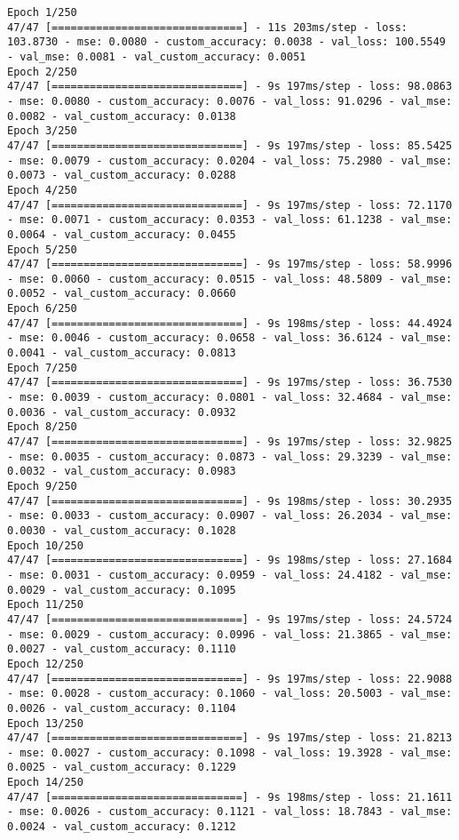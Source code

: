 \begin{lstlisting}
Epoch 1/250
47/47 [==============================] - 11s 203ms/step - loss: 103.8730 - mse: 0.0080 - custom_accuracy: 0.0038 - val_loss: 100.5549 - val_mse: 0.0081 - val_custom_accuracy: 0.0051
Epoch 2/250
47/47 [==============================] - 9s 197ms/step - loss: 98.0863 - mse: 0.0080 - custom_accuracy: 0.0076 - val_loss: 91.0296 - val_mse: 0.0082 - val_custom_accuracy: 0.0138
Epoch 3/250
47/47 [==============================] - 9s 197ms/step - loss: 85.5425 - mse: 0.0079 - custom_accuracy: 0.0204 - val_loss: 75.2980 - val_mse: 0.0073 - val_custom_accuracy: 0.0288
Epoch 4/250
47/47 [==============================] - 9s 197ms/step - loss: 72.1170 - mse: 0.0071 - custom_accuracy: 0.0353 - val_loss: 61.1238 - val_mse: 0.0064 - val_custom_accuracy: 0.0455
Epoch 5/250
47/47 [==============================] - 9s 197ms/step - loss: 58.9996 - mse: 0.0060 - custom_accuracy: 0.0515 - val_loss: 48.5809 - val_mse: 0.0052 - val_custom_accuracy: 0.0660
Epoch 6/250
47/47 [==============================] - 9s 198ms/step - loss: 44.4924 - mse: 0.0046 - custom_accuracy: 0.0658 - val_loss: 36.6124 - val_mse: 0.0041 - val_custom_accuracy: 0.0813
Epoch 7/250
47/47 [==============================] - 9s 197ms/step - loss: 36.7530 - mse: 0.0039 - custom_accuracy: 0.0801 - val_loss: 32.4684 - val_mse: 0.0036 - val_custom_accuracy: 0.0932
Epoch 8/250
47/47 [==============================] - 9s 197ms/step - loss: 32.9825 - mse: 0.0035 - custom_accuracy: 0.0873 - val_loss: 29.3239 - val_mse: 0.0032 - val_custom_accuracy: 0.0983
Epoch 9/250
47/47 [==============================] - 9s 198ms/step - loss: 30.2935 - mse: 0.0033 - custom_accuracy: 0.0907 - val_loss: 26.2034 - val_mse: 0.0030 - val_custom_accuracy: 0.1028
Epoch 10/250
47/47 [==============================] - 9s 198ms/step - loss: 27.1684 - mse: 0.0031 - custom_accuracy: 0.0959 - val_loss: 24.4182 - val_mse: 0.0029 - val_custom_accuracy: 0.1095
Epoch 11/250
47/47 [==============================] - 9s 197ms/step - loss: 24.5724 - mse: 0.0029 - custom_accuracy: 0.0996 - val_loss: 21.3865 - val_mse: 0.0027 - val_custom_accuracy: 0.1110
Epoch 12/250
47/47 [==============================] - 9s 197ms/step - loss: 22.9088 - mse: 0.0028 - custom_accuracy: 0.1060 - val_loss: 20.5003 - val_mse: 0.0026 - val_custom_accuracy: 0.1104
Epoch 13/250
47/47 [==============================] - 9s 197ms/step - loss: 21.8213 - mse: 0.0027 - custom_accuracy: 0.1098 - val_loss: 19.3928 - val_mse: 0.0025 - val_custom_accuracy: 0.1229
Epoch 14/250
47/47 [==============================] - 9s 198ms/step - loss: 21.1611 - mse: 0.0026 - custom_accuracy: 0.1121 - val_loss: 18.7843 - val_mse: 0.0024 - val_custom_accuracy: 0.1212

\end{lstlisting}
